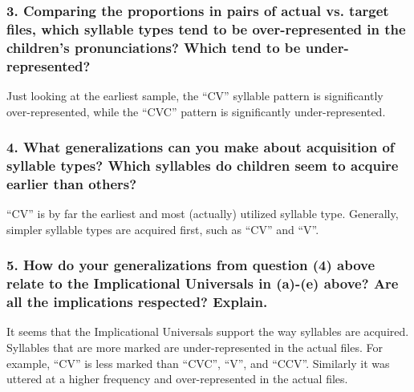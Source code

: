 \documentclass[a4paper,10pt]{article}
\begin{document}
  \subsubsection*{3. Comparing the proportions in pairs of actual vs. target files, which syllable types tend to be over-represented in the children’s pronunciations? Which tend to be under-represented?}
  Just looking at the earliest sample, the ``CV'' syllable pattern is significantly over-represented, while the ``CVC'' pattern is significantly under-represented.

  \subsubsection*{4. What generalizations can you make about acquisition of syllable types? Which syllables do
children seem to acquire earlier than others?}
  ``CV'' is by far the earliest and most (actually) utilized syllable type. Generally, simpler syllable types are acquired first, such as ``CV'' and ``V''.

  \subsubsection*{5. How do your generalizations from question (4) above relate to the Implicational Universals in (a)-(e) above? Are all the implications respected? Explain.}
  It seems that the Implicational Universals support the way syllables are acquired. Syllables that are more marked are under-represented in the actual files. For example, ``CV'' is less marked than ``CVC'', ``V'', and ``CCV''. Similarly it was uttered at a higher frequency and over-represented in the actual files.
  
\end{document}
